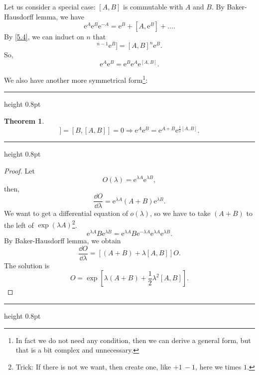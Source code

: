 \documentclass{article}
\newcommand{\singleline}{\hrule height 0.8pt}
\theoremstyle{1}
\newtheorem{theorem}[problem]{Theorem}
\newcommand{\ee}{\mathrm{e}}
\begin{document}
Let us consider a special case: $[A,B]$ is  commutable with $A$ and $B$. By Baker-Hausdorff lemma, we have
\begin{equation}
    \ee^A\ee^B\ee^{-A}=\ee^B+[A,\ee^B]+\dots.
\end{equation}
By \eqref{5.4}, we can induct on $n$ that 
\begin{equation}
    [A,[A,B]^{n-1}\ee^B]=[A,B]^n\ee^B.
\end{equation}
So, 
\begin{equation}\label{9.13}
    \ee^A\ee^B=\ee^B\ee^A\ee^{[A,B]}.
\end{equation}


We also have another more symmetrical form\footnote{In fact we do not need any condition, then we can derive a general form, but that is a bit complex and unnecessary.}:

\singleline

\begin{theorem}

    \begin{equation}
         [A,[A,B]]=[B,[A,B]]=0\Rightarrow \ee^A \ee^B = \ee^{A + B} \ee^{\frac{1}{2}[A, B]}.
    \end{equation}
\end{theorem}
\singleline
\begin{proof}
    Let 
    \begin{equation}
        O(\lambda)=\ee^{\lambda A}\ee^{\lambda B},
    \end{equation}
    then,
    \begin{equation}
        \frac{\dd{O}}{\dd{\lambda}}=\ee^{\lambda A}\left(A+B\right)\ee^{\lambda B}.
    \end{equation}
    We want to get a differential equation of $o(\lambda)$, so we have to take $(A+B)$ to the left of $\exp(\lambda A)$\footnote{Trick: If there is not we want, then create one, like $+1\, -1$, here we times $1$.}.
    \begin{equation}
        \ee^{\lambda A}B\ee^{\lambda B}=\ee^{\lambda A}B\ee^{-\lambda A}\ee^{\lambda A}\ee^{\lambda B}.
    \end{equation}
    By Baker-Hausdorff lemma, we obtain
    \begin{equation}
        \frac{\dd{O}}{\dd{\lambda}}=\left[\left(A+B\right)+\lambda[A,B]\right]O.
    \end{equation}
    The solution is 
    \begin{equation}
        O=\exp\left[\lambda(A+B)+\frac{1}{2}\lambda^2[A,B]\right].
    \end{equation}
\end{proof}
\singleline
\end{document}
